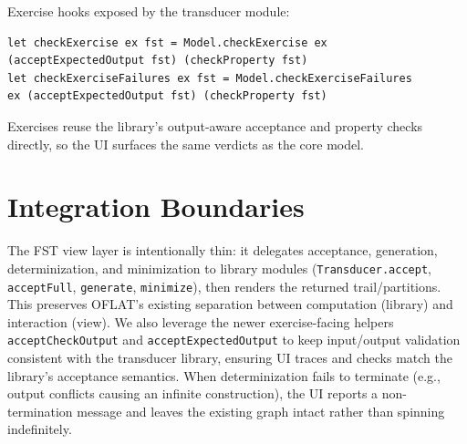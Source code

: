 Exercise hooks exposed by the transducer module:
\begin{verbatim}
let checkExercise ex fst = Model.checkExercise ex 
(acceptExpectedOutput fst) (checkProperty fst)
let checkExerciseFailures ex fst = Model.checkExerciseFailures 
ex (acceptExpectedOutput fst) (checkProperty fst)
\end{verbatim}
Exercises reuse the library's output-aware acceptance and property checks directly, so the UI surfaces the same 
verdicts as the core model.

\section{Integration Boundaries}
\label{sec:oflat_integration}
The FST view layer is intentionally thin: it delegates acceptance, generation, determinization, and minimization to library
modules (\texttt{Transducer.accept}, \texttt{acceptFull}, \texttt{generate}, \texttt{minimize}), then renders the returned
trail/partitions. This preserves OFLAT's existing separation between computation (library) and interaction (view).
We also leverage the newer exercise-facing helpers \texttt{acceptCheckOutput} and \texttt{acceptExpectedOutput} to keep
input/output validation consistent with the transducer library, ensuring UI traces and checks match the library's
acceptance semantics. When determinization fails to terminate (e.g., output conflicts causing an infinite construction),
the UI reports a non-termination message and leaves the existing graph intact rather than spinning indefinitely.

